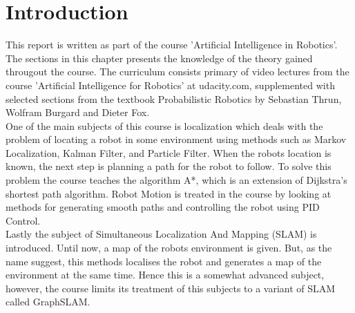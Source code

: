 
\section{Introduction} %
\label{sec:theory_introduction}

This report is written as part of the course 'Artificial Intelligence in Robotics'. The sections in this chapter presents the knowledge of the theory gained througout the course. The curriculum consists primary of video lectures from the course 'Artificial Intelligence for Robotics' at udacity.com, supplemented with selected sections from the textbook Probabilistic Robotics by Sebastian Thrun, Wolfram Burgard and Dieter Fox.\\

One of the main subjects of this course is localization which deals with the problem of locating a robot in some environment using methods such as Markov Localization, Kalman Filter, and Particle Filter. When the robots location is known, the next step is planning a path for the robot to follow. To solve this problem the course teaches the algorithm A*, which is an extension of Dijkstra's shortest path algorithm. Robot Motion is treated in the course by looking at methods for generating smooth paths and controlling the robot using PID Control.\\

Lastly the subject of Simultaneous Localization And Mapping (SLAM) is introduced. Until now, a map of the robots environment is given. But, as the name suggest, this methods localises the robot and generates a map of the environment at the same time. Hence this is a somewhat advanced subject, however, the course limits its treatment of this subjects to a variant of SLAM called GraphSLAM.


